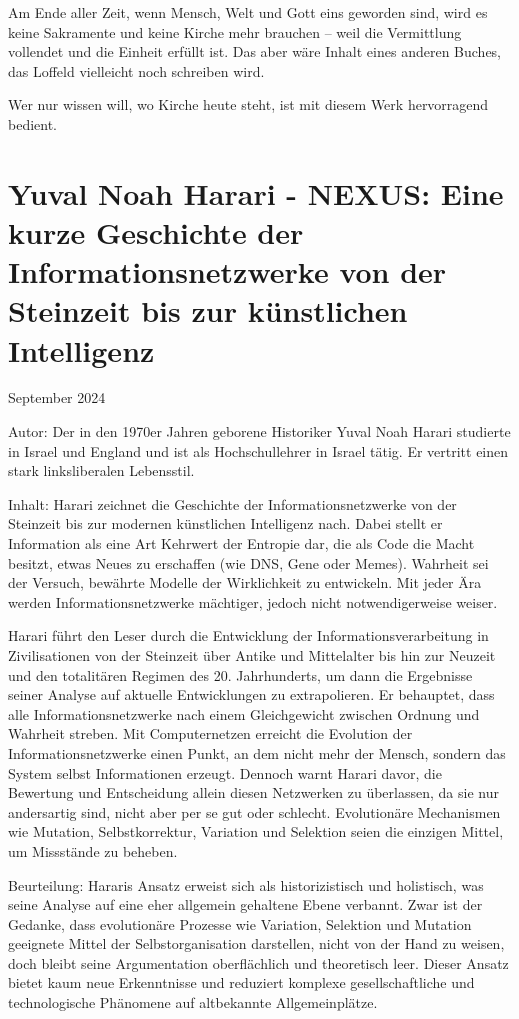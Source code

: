 \documentclass[
]{article}
\begin{document}
Am Ende aller Zeit, wenn Mensch, Welt und Gott eins geworden sind, wird es keine Sakramente und keine Kirche mehr brauchen -- weil die Vermittlung vollendet und die Einheit erfüllt ist. Das aber wäre Inhalt eines anderen Buches, das Loffeld vielleicht noch schreiben wird.

Wer nur wissen will, wo Kirche heute steht, ist mit diesem Werk hervorragend bedient.

\section{Yuval Noah Harari - NEXUS: Eine kurze Geschichte der Informationsnetzwerke von der Steinzeit bis zur künstlichen Intelligenz}\label{yuval-noah-harari---nexus-eine-kurze-geschichte-der-informationsnetzwerke-von-der-steinzeit-bis-zur-kuxfcnstlichen-intelligenz}

September 2024

Autor: Der in den 1970er Jahren geborene Historiker Yuval Noah Harari studierte in Israel und England und ist als Hochschullehrer in Israel tätig. Er vertritt einen stark linksliberalen Lebensstil.

Inhalt: Harari zeichnet die Geschichte der Informationsnetzwerke von der Steinzeit bis zur modernen künstlichen Intelligenz nach. Dabei stellt er Information als eine Art Kehrwert der Entropie dar, die als Code die Macht besitzt, etwas Neues zu erschaffen (wie DNS, Gene oder Memes). Wahrheit sei der Versuch, bewährte Modelle der Wirklichkeit zu entwickeln. Mit jeder Ära werden Informationsnetzwerke mächtiger, jedoch nicht notwendigerweise weiser.

Harari führt den Leser durch die Entwicklung der Informationsverarbeitung in Zivilisationen von der Steinzeit über Antike und Mittelalter bis hin zur Neuzeit und den totalitären Regimen des 20. Jahrhunderts, um dann die Ergebnisse seiner Analyse auf aktuelle Entwicklungen zu extrapolieren. Er behauptet, dass alle Informationsnetzwerke nach einem Gleichgewicht zwischen Ordnung und Wahrheit streben. Mit Computernetzen erreicht die Evolution der Informationsnetzwerke einen Punkt, an dem nicht mehr der Mensch, sondern das System selbst Informationen erzeugt. Dennoch warnt Harari davor, die Bewertung und Entscheidung allein diesen Netzwerken zu überlassen, da sie nur andersartig sind, nicht aber per se gut oder schlecht. Evolutionäre Mechanismen wie Mutation, Selbstkorrektur, Variation und Selektion seien die einzigen Mittel, um Missstände zu beheben.

Beurteilung: Hararis Ansatz erweist sich als historizistisch und holistisch, was seine Analyse auf eine eher allgemein gehaltene Ebene verbannt. Zwar ist der Gedanke, dass evolutionäre Prozesse wie Variation, Selektion und Mutation geeignete Mittel der Selbstorganisation darstellen, nicht von der Hand zu weisen, doch bleibt seine Argumentation oberflächlich und theoretisch leer. Dieser Ansatz bietet kaum neue Erkenntnisse und reduziert komplexe gesellschaftliche und technologische Phänomene auf altbekannte Allgemeinplätze.
\end{document}
